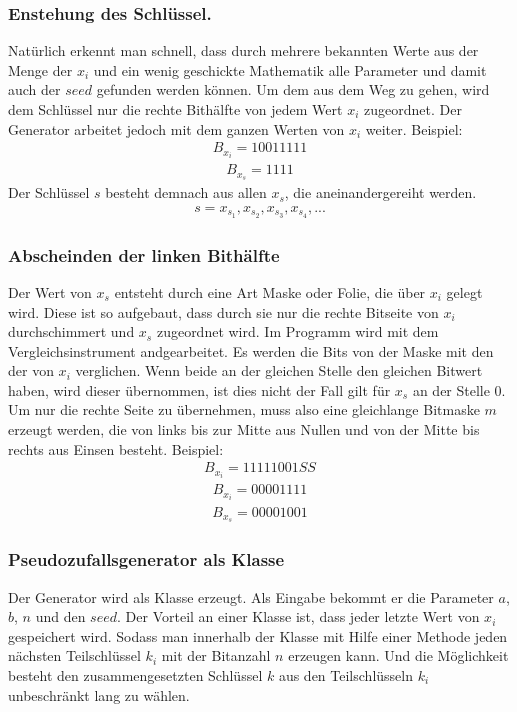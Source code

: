 \documentclass[10pt,a4paper]{article}
\begin{document}
\subsubsection{Enstehung des Schlüssel.}
Natürlich erkennt man schnell, dass durch mehrere bekannten Werte aus der Menge der $x_i$ und ein wenig geschickte Mathematik alle Parameter und damit auch der $seed$ gefunden werden können. Um dem aus dem Weg zu gehen, wird dem Schlüssel nur die rechte Bithälfte von jedem Wert $x_i$ zugeordnet. Der Generator arbeitet jedoch mit dem ganzen Werten von $x_i$ weiter. Beispiel:
\begin{align*}
    B_{x_i} = 1001 1111
\end{align*}
\begin{align*}
    B_{x_s} = 1111
\end{align*}
Der Schlüssel $s$ besteht demnach aus allen $x_s$, die aneinandergereiht werden.
\begin{align*}
    s = x_{s_1}, x_{s_2}, x_{s_3}, x_{s_4}, ...
\end{align*}

\subsubsection{Abscheinden der linken Bithälfte}
Der Wert von $x_s$ entsteht durch eine Art Maske oder Folie, die über $x_i$ gelegt wird. Diese ist so aufgebaut, dass durch sie nur die rechte Bitseite von $x_i$ durchschimmert und $x_s$ zugeordnet wird. Im Programm wird mit dem Vergleichsinstrument \flqq and\frqq gearbeitet. Es werden die Bits von der Maske mit den der von $x_i$ verglichen. Wenn beide an der gleichen Stelle den gleichen Bitwert haben, wird dieser übernommen, ist dies nicht der Fall gilt für $x_s$ an der Stelle 0. Um nur die rechte Seite zu übernehmen, muss also eine gleichlange Bitmaske $m$ erzeugt werden, die von links bis zur Mitte aus Nullen und von der Mitte bis rechts aus Einsen besteht.
Beispiel:
\begin{align*}
    B_{x_i} = 1111 1001SS
\end{align*}
\begin{align*}
    B_{x_i} = 0000 1111
\end{align*}
\begin{align*}
    B_{x_s} = 0000 1001
\end{align*}
\subsubsection{Pseudozufallsgenerator als Klasse}
Der Generator wird als Klasse erzeugt. Als Eingabe bekommt er die Parameter $a$, $b$, $n$ und
den $seed$. Der Vorteil an einer Klasse ist, dass jeder letzte Wert von $x_i$ gespeichert wird. Sodass
man innerhalb der Klasse mit Hilfe einer Methode jeden nächsten Teilschlüssel $k_i$ mit der
Bitanzahl $n$ erzeugen kann. Und die Möglichkeit besteht den zusammengesetzten Schlüssel $k$
aus den Teilschlüsseln $k_i$ unbeschränkt lang zu wählen.
\end{document}
